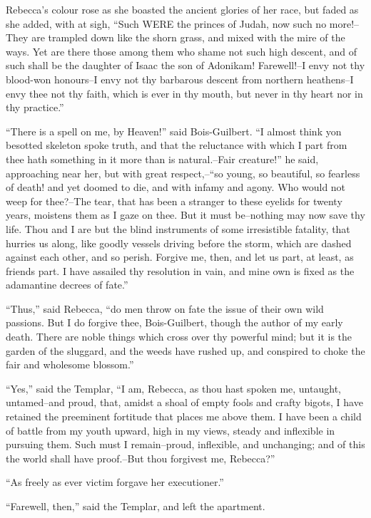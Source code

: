 Rebecca's colour rose as she boasted the ancient glories of her race,
but faded as she added, with at sigh, ``Such WERE the princes of Judah,
now such no more!--They are trampled down like the shorn grass, and
mixed with the mire of the ways. Yet are there those among them who
shame not such high descent, and of such shall be the daughter of Isaac
the son of Adonikam! Farewell!--I envy not thy blood-won honours--I envy
not thy barbarous descent from northern heathens--I envy thee not thy
faith, which is ever in thy mouth, but never in thy heart nor in thy
practice.''

``There is a spell on me, by Heaven!'' said Bois-Guilbert. ``I almost
think yon besotted skeleton spoke truth, and that the reluctance with
which I part from thee hath something in it more than is natural.--Fair
creature!'' he said, approaching near her, but with great respect,--``so
young, so beautiful, so fearless of death! and yet doomed to die, and
with infamy and agony. Who would not weep for thee?--The tear, that has
been a stranger to these eyelids for twenty years, moistens them as I
gaze on thee. But it must be--nothing may now save thy life. Thou and I
are but the blind instruments of some irresistible fatality, that
hurries us along, like goodly vessels driving before the storm, which
are dashed against each other, and so perish. Forgive me, then, and let
us part, at least, as friends part. I have assailed thy resolution in
vain, and mine own is fixed as the adamantine decrees of fate.''

``Thus,'' said Rebecca, ``do men throw on fate the issue of their own
wild passions. But I do forgive thee, Bois-Guilbert, though the author
of my early death. There are noble things which cross over thy powerful
mind; but it is the garden of the sluggard, and the weeds have rushed
up, and conspired to choke the fair and wholesome blossom.''

``Yes,'' said the Templar, ``I am, Rebecca, as thou hast spoken me,
untaught, untamed--and proud, that, amidst a shoal of empty fools and
crafty bigots, I have retained the preeminent fortitude that places me
above them. I have been a child of battle from my youth upward, high in
my views, steady and inflexible in pursuing them. Such must I
remain--proud, inflexible, and unchanging; and of this the world shall
have proof.--But thou forgivest me, Rebecca?''

``As freely as ever victim forgave her executioner.''

``Farewell, then,'' said the Templar, and left the apartment.

